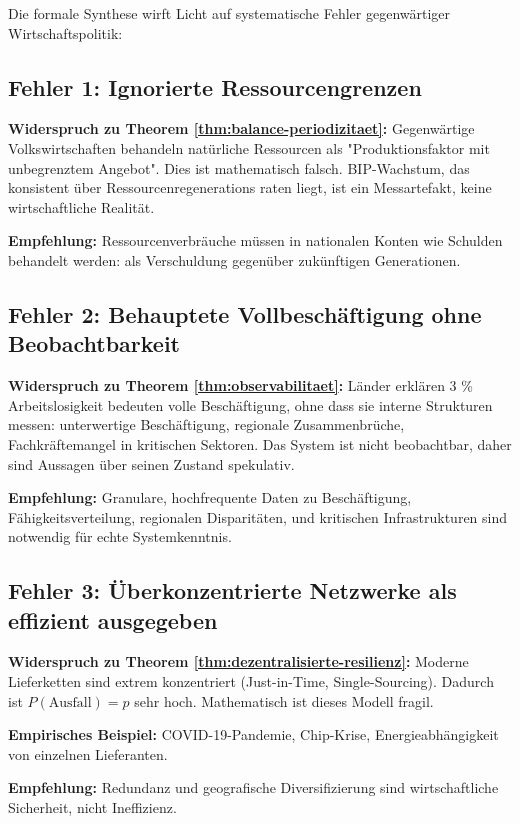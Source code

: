 \documentclass[a4paper, 12pt, twoside, openright]{report}
\theoremstyle{definition}
\theoremstyle{definition}
\begin{document}
Die formale Synthese wirft Licht auf systematische Fehler gegenwärtiger Wirtschaftspolitik:

\subsection{Fehler 1: Ignorierte Ressourcengrenzen}

\textbf{Widerspruch zu Theorem \ref{thm:balance-periodizitaet}:}
Gegenwärtige Volkswirtschaften behandeln natürliche Ressourcen als "Produktionsfaktor mit unbegrenztem Angebot". Dies ist mathematisch falsch. BIP-Wachstum, das konsistent über Ressourcenregenerations raten liegt, ist ein Messartefakt, keine wirtschaftliche Realität.

\textbf{Empfehlung:} Ressourcenverbräuche müssen in nationalen Konten wie Schulden behandelt werden: als Verschuldung gegenüber zukünftigen Generationen.

\subsection{Fehler 2: Behauptete Vollbeschäftigung ohne Beobachtbarkeit}

\textbf{Widerspruch zu Theorem \ref{thm:observabilitaet}:}
Länder erklären 3 \% Arbeitslosigkeit bedeuten volle Beschäftigung, ohne dass sie interne Strukturen messen: unterwertige Beschäftigung, regionale Zusammenbrüche, Fachkräftemangel in kritischen Sektoren. Das System ist nicht beobachtbar, daher sind Aussagen über seinen Zustand spekulativ.

\textbf{Empfehlung:} Granulare, hochfrequente Daten zu Beschäftigung, Fähigkeitsverteilung, regionalen Disparitäten, und kritischen Infrastrukturen sind notwendig für echte Systemkenntnis.

\subsection{Fehler 3: Überkonzentrierte Netzwerke als effizient ausgegeben}

\textbf{Widerspruch zu Theorem \ref{thm:dezentralisierte-resilienz}:}
Moderne Lieferketten sind extrem konzentriert (Just-in-Time, Single-Sourcing). Dadurch ist $P(\text{Ausfall}) = p$ sehr hoch. Mathematisch ist dieses Modell fragil.

\textbf{Empirisches Beispiel:} COVID-19-Pandemie, Chip-Krise, Energieabhängigkeit von einzelnen Lieferanten.

\textbf{Empfehlung:} Redundanz und geografische Diversifizierung sind wirtschaftliche Sicherheit, nicht Ineffizienz.
\end{document}
